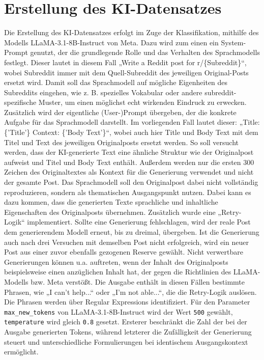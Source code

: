 \section{Erstellung des KI-Datensatzes}
\label{sec:erstellung_ki_datensatz}
Die Erstellung des KI-Datensatzes erfolgt im Zuge der Klassifikation, mithilfe des Modells LLaMA-3.1-8B-Instruct von Meta. Dazu wird zum einen ein System-Prompt genutzt, der die grundlegende Rolle und das Verhalten des Sprachmodells festlegt. Dieser lautet in diesem Fall „Write a Reddit post for r/\{Subreddit\}“, wobei Subreddit immer mit dem Quell-Subreddit des jeweiligen Original-Posts ersetzt wird. Damit soll das Sprachmodell auf mögliche Eigenheiten des Subreddits eingehen, wie z. B. spezielles Vokabular oder andere subreddit-spezifische Muster, um einen möglichst echt wirkenden Eindruck zu erwecken. Zusätzlich wird der eigentliche (User-)Prompt übergeben, der die konkrete Aufgabe für das Sprachmodell darstellt. Im vorliegenden Fall lautet dieser: „Title: \{'Title'\} Context: \{'Body Text'\}“, wobei auch hier Title und Body Text mit dem Titel und Text des jeweiligen Originalposts ersetzt werden. So soll versucht werden, dass der KI-generierte Text eine ähnliche Struktur wie der Originalpost aufweist und Titel und Body Text enthält. Außerdem werden nur die ersten 300 Zeichen des Originaltextes als Kontext für die Generierung verwendet und nicht der gesamte Post. Das Sprachmodell soll den Originalpost dabei nicht vollständig reproduzieren, sondern als thematischen Ausgangspunkt nutzen. Dabei kann es dazu kommen, dass die generierten Texte sprachliche und inhaltliche Eigenschaften des Originalposts übernehmen. Zusätzlich wurde eine „Retry-Logik“ implementiert. Sollte eine Generierung fehlschlagen, wird der reale Post dem generierendem Modell erneut, bis zu dreimal, übergeben. Ist die Generierung auch nach drei Versuchen mit demselben Post nicht erfolgreich, wird ein neuer Post aus einer zuvor ebenfalls gezogenen Reserve gewählt. Nicht verwertbare Generierungen können u.a. auftreten, wenn der Inhalt des Originalposts beispielsweise einen anzüglichen Inhalt hat, der gegen die Richtlinien des LLaMA-Modells bzw. Meta verstößt. Die Ausgabe enthält in diesen Fällen bestimmte Phrasen, wie „I can't help...“ oder „I'm not able...“, die die Retry-Logik auslösen. Die Phrasen werden über Regular Expressions identifiziert. Für den Parameter \lstinline|max_new_tokens| von LLaMA-3.1-8B-Instruct wird der Wert \lstinline|500| gewählt, \lstinline|temperature| wird gleich \lstinline|0.8| gesetzt. Ersterer beschränkt die Zahl der bei der Ausgabe generierten Tokens, während letzterer die Zufälligkeit der Generierung steuert und unterschiedliche Formulierungen bei identischem Ausgangskontext ermöglicht.


